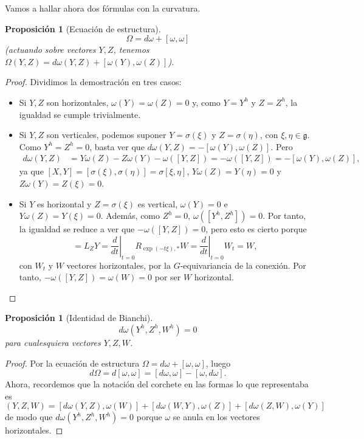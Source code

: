 \documentclass[12pt,a4paper]{article}
\newtheorem{prop}[thm]{Proposición}
\theoremstyle{definition} \newtheorem{defn}[thm]{Definición}
\theoremstyle{definition} \newtheorem{ejemplo}[thm]{Ejemplo}
\theoremstyle{definition} \newtheorem{ejercicio}[thm]{Ejercicio}
\theoremstyle{remark} \newtheorem*{obs}{Observación}
\def\gg{\mathfrak{g}}
\begin{document}
	Vamos a hallar ahora dos fórmulas con la curvatura.
	\begin{prop}[Ecuación de estructura]
	  \begin{equation*}
	    \Omega=d\omega + [\omega,\omega]
	  \end{equation*}
	  (actuando sobre vectores $Y,Z$, tenemos $\Omega(Y,Z)=d\omega(Y,Z)+[\omega(Y),\omega(Z)]$).
	\end{prop}
	\begin{proof}
	  Dividimos la demostración en tres casos:
	  \begin{itemize}
	    \item Si $Y,Z$ son horizontales, $\omega(Y)=\omega(Z)=0$ y, como $Y=Y^h$ y $Z=Z^h$, la igualdad se cumple trivialmente.
	    \item Si $Y,Z$ son verticales, podemos suponer $Y=\sigma(\xi)$ y $Z=\sigma(\eta)$, con $\xi, \eta \in \gg$. Como $Y^h=Z^h=0$, basta ver que $d\omega(Y,Z)=-[\omega(Y),\omega(Z)]$. Pero
	      \begin{align*}
		d\omega(Y,Z)& =Y\omega(Z)-Z \omega(Y)-\omega([Y,Z])=-\omega([Y,Z])=-[\omega(Y),\omega(Z)],
	      \end{align*}
	      ya que $[X,Y]=[\sigma(\xi),\sigma(\eta)]=\sigma[\xi,\eta]$, $Y \omega(Z)=Y(\eta)=0$ y $Z \omega(Y)=Z(\xi)=0$.
	    \item Si $Y$ es horizontal y $Z=\sigma(\xi)$ es vertical, $\omega(Y)=0$ e $Y\omega(Z)=Y(\xi)=0$. Además, como $Z^h=0$, $\omega([Y^h,Z^h])=0$. Por tanto, la igualdad se reduce a ver que $-\omega([Y,Z])=0$, pero esto es cierto porque 
	      \begin{equation*}
		[Z,Y]=L_Z Y=\left.\frac{d}{dt}\right|_{t=0} R_{\exp(-t\xi),*}W=\left.\frac{d}{dt}\right|_{t=0} W_t=W,
	      \end{equation*}
	      con $W_t$ y $W$ vectores horizontales, por la $G$-equivariancia de la conexión. Por tanto, $-\omega([Y,Z])=\omega(W)=0$ por ser $W$ horizontal.
	  \end{itemize}

	\end{proof}

	\begin{prop}[Identidad de Bianchi]
	  \begin{equation*}
	    d\omega(Y^h,Z^h,W^h)=0
	  \end{equation*}
	  para cualesquiera vectores $Y,Z,W$.
	\end{prop}
	\begin{proof}
	  Por la ecuación de estructura $\Omega=d\omega + [\omega,\omega]$, luego
	  \begin{equation*}
	    d\Omega=d[\omega,\omega]=[d\omega,\omega]-[\omega,d\omega].
	  \end{equation*}
	  Ahora, recordemos que la notación del corchete en las formas lo que representaba es
	  \begin{equation*}
	    [d\omega,\omega](Y,Z,W)=[d\omega(Y,Z),\omega(W)]+[d\omega(W,Y), \omega(Z)]+[d\omega(Z,W),\omega(Y)]
	  \end{equation*}
	  de modo que $d\omega(Y^h,Z^h,W^h)=0$ porque $\omega$ se anula en los vectores horizontales.
	\end{proof}
	    
\end{document}
